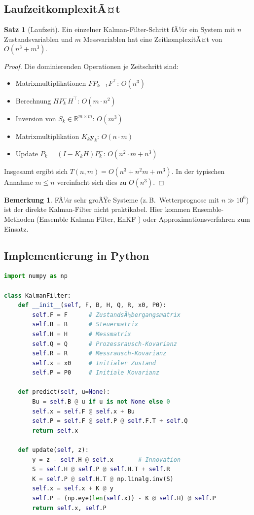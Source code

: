 ﻿\documentclass[a4paper,12pt]{article}
\theoremstyle{definition}
\newtheorem{satz}{Satz}
\newtheorem{bemerkung}{Bemerkung}
\begin{document}
\subsection{LaufzeitkomplexitÃ¤t}

\begin{satz}[Laufzeit]
    Ein einzelner Kalman-Filter-Schritt fÃ¼r ein System mit $n$ Zustandsvariablen
    und $m$ Messvariablen hat eine ZeitkomplexitÃ¤t von $O(n^3 + m^3)$.
\end{satz}

\begin{proof}
Die dominierenden Operationen je Zeitschritt sind:
\begin{itemize}
    \item Matrixmultiplikationen $F P_{k-1} F^\top$: $O(n^3)$
    \item Berechnung $H P_k^- H^\top$: $O(m \cdot n^2)$
    \item Inversion von $S_k \in \mathbb{R}^{m \times m}$: $O(m^3)$
    \item Matrixmultiplikation $K_k \mathbf{y}_k$: $O(n \cdot m)$
    \item Update $P_k = (I - K_k H) P_k^-$: $O(n^2 \cdot m + n^3)$
\end{itemize}
Insgesamt ergibt sich $T(n, m) = O(n^3 + n^2 m + m^3)$.
In der typischen Annahme $m \leq n$ vereinfacht sich dies zu $O(n^3)$.
\end{proof}

\begin{bemerkung}
    FÃ¼r sehr groÃŸe Systeme (z.\,B.\ Wetterprognose mit $n \gg 10^6$) ist der direkte
    Kalman-Filter nicht praktikabel. Hier kommen Ensemble-Methoden (Ensemble Kalman
    Filter, EnKF \cite{evensen1994}) oder Approximationsverfahren zum Einsatz.
\end{bemerkung}

\subsection{Implementierung in Python}

\begin{lstlisting}[language=Python, caption=Kalman-Filter in Python/NumPy]
import numpy as np

class KalmanFilter:
    def __init__(self, F, B, H, Q, R, x0, P0):
        self.F = F      # ZustandsÃ¼bergangsmatrix
        self.B = B      # Steuermatrix
        self.H = H      # Messmatrix
        self.Q = Q      # Prozessrausch-Kovarianz
        self.R = R      # Messrausch-Kovarianz
        self.x = x0     # Initialer Zustand
        self.P = P0     # Initiale Kovarianz

    def predict(self, u=None):
        Bu = self.B @ u if u is not None else 0
        self.x = self.F @ self.x + Bu
        self.P = self.F @ self.P @ self.F.T + self.Q
        return self.x

    def update(self, z):
        y = z - self.H @ self.x       # Innovation
        S = self.H @ self.P @ self.H.T + self.R
        K = self.P @ self.H.T @ np.linalg.inv(S)
        self.x = self.x + K @ y
        self.P = (np.eye(len(self.x)) - K @ self.H) @ self.P
        return self.x, self.P
\end{lstlisting}
\end{document}
